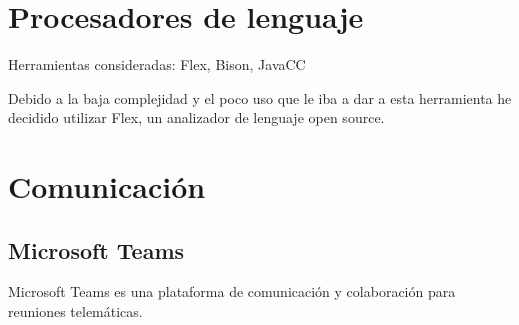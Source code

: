 \section{Procesadores de lenguaje}

Herramientas consideradas: Flex, Bison, JavaCC

Debido a la baja complejidad y el poco uso que le iba a dar a esta herramienta he decidido utilizar Flex, un analizador de lenguaje open source.


\section{Comunicación}
\subsection{Microsoft Teams}

Microsoft Teams es una plataforma de comunicación y colaboración para reuniones telemáticas.